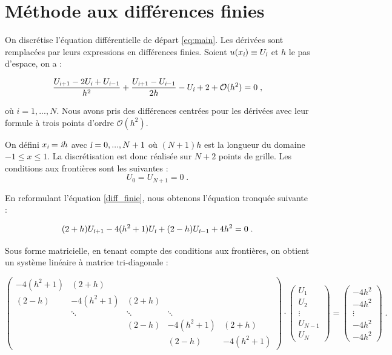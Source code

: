 \documentclass{report}
\begin{document}
\section{Méthode aux différences finies}

On discrétise l'équation différentielle de départ \eqref{eq:main}. Les dérivées sont remplacées par leurs expressions en différences finies. Soient $u(x_{\textsl{i}}) \equiv U_{\textsl{i}}$ et $h$ le pas d'espace, on a :

\begin{equation}
\frac{U_{\textsl{i}+1} - 2 U_{\textsl{i}} + U_{\textsl{i}-1}}{h^2} + \frac{U_{\textsl{i}+1} - U_{\textsl{i}-1}}{2h} - U_{\textsl{i}} +2 + \mathcal{O}(h^2) = 0\;,\label{diff_finie}
\end{equation}

où $i = 1,...,N$. Nous avons pris des différences centrées pour les dérivées avec leur formule à trois points d'ordre $\mathcal{O}(h^2)$. 

On défini $x_{\textsl{i}}=\textsl{i}h$ avec $\textsl{i} = 0,...,N+1$ où $(N+1)h$ est la longueur du domaine $-1\leq x \leq 1$. La discrétisation est donc réalisée sur $N+2$ points de grille. Les conditions aux frontières sont les suivantes :
\begin{equation}
U_{0}=U_{N+1}=0\;.
\end{equation}

En reformulant l'équation \eqref{diff_finie}, nous obtenons l'équation tronquée suivante :

\begin{equation}
(2+h)U_{\textsl{i}+1}-4(h^2+1)U_{\textsl{i}}+(2-h)U_{\textsl{i}-1}+4h^2=0\;.
\end{equation}

Sous forme matricielle, en tenant compte des conditions aux frontières, on obtient un système linéaire à matrice tri-diagonale :

\begin{equation}
\begin{pmatrix}
-4(h^2+1) & (2+h) &  &  & \\ 
 (2-h) & -4(h^2+1) & (2+h) &  & \\ 
 & \ddots & \ddots & \ddots & \\ 
 &  & (2-h) & -4(h^2+1) & (2+h)\\ 
 &  &  & (2-h) & -4(h^2+1)
\end{pmatrix} \cdot \begin{pmatrix}
 U_{1}\\ 
 U_{2}\\ 
 \vdots\\ 
 U_{N-1}\\ 
 U_{N}
\end{pmatrix} =
\begin{pmatrix}
 -4h^2\\ 
 -4h^2\\ 
 \vdots\\ 
 -4h^2\\ 
 -4h^2
\end{pmatrix}\;.
\end{equation}
\end{document}
